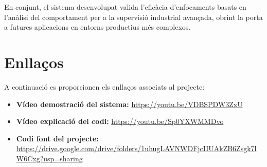 En conjunt, el sistema desenvolupat valida l’eficàcia d’enfocaments basats en l’anàlisi del comportament per a la supervisió industrial avançada, obrint la porta a futures aplicacions en entorns productius més complexos.

\section*{Enllaços}
A continuació es proporcionen els enllaços associats al projecte:
\begin{itemize}
    \item \textbf{Vídeo demostració del sistema:} \url{https://youtu.be/VDBSPDW3ZxU}
    \item \textbf{Vídeo explicació del codi:} \url{https://youtu.be/Sp0YXWMMDvo}
    \item \textbf{Codi font del projecte:} \url{https://drive.google.com/drive/folders/1uhugLAVNWDFjcIIUAkZB6Zsgk7lW6Cxg?usp=sharing}
\end{itemize}